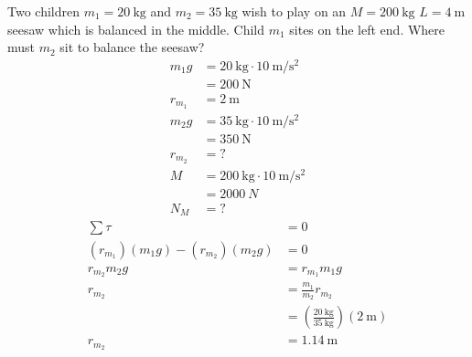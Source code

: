 \documentclass{article}
\begin{document}
Two children $ m_1 = \SI{20}{\kilogram} $ and $ m_2 = \SI{35}{\kilogram} $ wish to play on an $ M = \SI{200}{\kilogram} $ $ L = \SI{4}{\meter} $ seesaw which is balanced in the middle. Child $ m_1 $ sites on the left end. Where must $ m_2 $ sit to balance the seesaw?
\begin{align*}
	m_1g & = \SI{20}{\kilogram} \cdot \SI{10}{\meter \per \second \squared} \\
		 & = \SI{200}{\newton} \\
	r_{m_1} & = \SI{2}{\meter} \\
	m_2g & = \SI{35}{\kilogram} \cdot \SI{10}{\meter \per \second \squared} \\
		 & = \SI{350}{\newton} \\
	r_{m_2} & = ? \\
	M & = \SI{200}{\kilogram} \cdot \SI{10}{\meter \per \second \squared} \\
	  & = \SI{2000}{N} \\
	N_M & = ?
\end{align*}
\begin{align*}
	\sum \tau & = 0 \\
	(r_{m_1})(m_1g) - (r_{m_2})(m_2g) & = 0 \\
	r_{m_2}m_2g & = r_{m_1}m_1g \\
	r_{m_2} & = \frac{m_1}{m_2}r_{m_2} \\
			& = \left( \frac{\SI{20}{\kilogram}}{\SI{35}{\kilogram}} \right) \left( \SI{2}{\meter} \right) \\
	r_{m_2} & = \SI{1.14}{\meter}
\end{align*}
\end{document}
